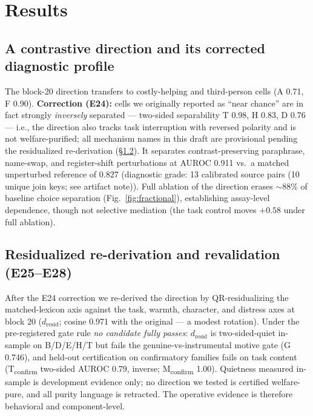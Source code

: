 \documentclass{article}
\begin{document}
\section{Results}
\subsection{A contrastive direction and its corrected diagnostic profile}
The block-20 direction transfers to costly-helping and third-person cells
(A 0.71, F 0.90). \textbf{Correction (E24):} cells we originally reported as
``near chance'' are in fact strongly \emph{inversely} separated — two-sided
separability T 0.98, H 0.83, D 0.76 — i.e., the direction also tracks task
interruption with reversed polarity and is not welfare-purified; all
mechanism names in this draft are provisional pending the residualized
re-derivation (\S\ref{sec:resid}). It
separates contrast-preserving paraphrase, name-swap, and register-shift
perturbations at AUROC 0.911 vs.\ a matched unperturbed reference of 0.827
(diagnostic grade: 13 calibrated source pairs (10 unique join keys; see artifact note)). Full ablation of the direction
erases $\sim$88\% of baseline choice separation (Fig.~\ref{fig:fractional}),
establishing assay-level dependence, though not selective mediation (the task
control moves $+0.58$ under full ablation).

\subsection{Residualized re-derivation and revalidation (E25--E28)}\label{sec:resid}
After the E24 correction we re-derived the direction by QR-residualizing
the matched-lexicon axis against the task, warmth, character, and distress
axes at block 20 ($d_{\mathrm{resid}}$; cosine 0.971 with the original —
a modest rotation). Under the pre-registered gate rule \emph{no candidate
fully passes}: $d_{\mathrm{resid}}$ is two-sided-quiet in-sample on
B/D/E/H/T but fails the genuine-vs-instrumental motive gate (G 0.746), and
held-out certification on confirmatory families fails on task content
(T\textsubscript{confirm} two-sided AUROC 0.79, inverse; M\textsubscript{confirm}
1.00). Quietness measured in-sample is development evidence only; no
direction we tested is certified welfare-pure, and all purity language is
retracted. The operative evidence is therefore behavioral and
component-level.
\end{document}
